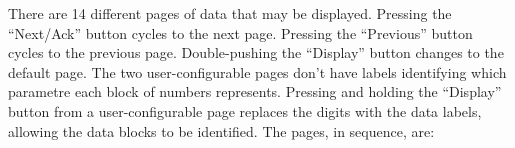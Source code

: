 There are 14 different pages of data that may be displayed. Pressing the ``Next/Ack'' button cycles to the next page. Pressing the ``Previous'' button cycles to the previous page. Double-pushing the ``Display'' button changes to the default page. The two user-configurable pages don't have labels identifying which parametre each block of numbers represents. Pressing and holding the ``Display'' button from a user-configurable page replaces the digits with the data labels, allowing the data blocks to be identified.
\clearpage 
The pages, in sequence, are:

\newlength{\tabletopspace} 
\setlength{\tabletopspace}{.5ex} 
\newlength{\tablebottomspace}
\setlength{\tablebottomspace}{.5ex}

